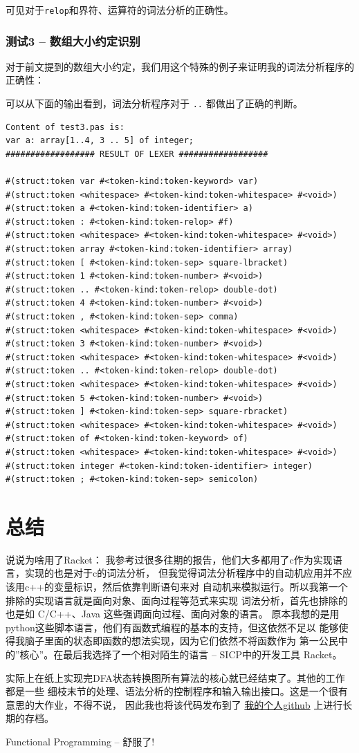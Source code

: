 \documentclass[lang=cn]{elegantpaper}
\begin{document}
可见对于\lstinline|relop|和界符、运算符的词法分析的正确性。

\subsubsection{测试3 -- 数组大小约定识别}

对于前文提到的数组大小约定，我们用这个特殊的例子来证明我的词法分析程序的正确性：



可以从下面的输出看到，词法分析程序对于 \lstinline|..| 都做出了正确的判断。

\begin{lstlisting}
Content of test3.pas is:
var a: array[1..4, 3 .. 5] of integer;
################## RESULT OF LEXER ##################

#(struct:token var #<token-kind:token-keyword> var)
#(struct:token <whitespace> #<token-kind:token-whitespace> #<void>)
#(struct:token a #<token-kind:token-identifier> a)
#(struct:token : #<token-kind:token-relop> #f)
#(struct:token <whitespace> #<token-kind:token-whitespace> #<void>)
#(struct:token array #<token-kind:token-identifier> array)
#(struct:token [ #<token-kind:token-sep> square-lbracket)
#(struct:token 1 #<token-kind:token-number> #<void>)
#(struct:token .. #<token-kind:token-relop> double-dot)
#(struct:token 4 #<token-kind:token-number> #<void>)
#(struct:token , #<token-kind:token-sep> comma)
#(struct:token <whitespace> #<token-kind:token-whitespace> #<void>)
#(struct:token 3 #<token-kind:token-number> #<void>)
#(struct:token <whitespace> #<token-kind:token-whitespace> #<void>)
#(struct:token .. #<token-kind:token-relop> double-dot)
#(struct:token <whitespace> #<token-kind:token-whitespace> #<void>)
#(struct:token 5 #<token-kind:token-number> #<void>)
#(struct:token ] #<token-kind:token-sep> square-rbracket)
#(struct:token <whitespace> #<token-kind:token-whitespace> #<void>)
#(struct:token of #<token-kind:token-keyword> of)
#(struct:token <whitespace> #<token-kind:token-whitespace> #<void>)
#(struct:token integer #<token-kind:token-identifier> integer)
#(struct:token ; #<token-kind:token-sep> semicolon)
\end{lstlisting}

\section{总结}

说说为啥用了Racket：
我参考过很多往期的报告，他们大多都用了c作为实现语言，实现的也是对于c的词法分析，
但我觉得词法分析程序中的自动机应用并不应该用c++的变量标识，然后依靠判断语句来对
自动机来模拟运行。所以我第一个排除的实现语言就是面向对象、面向过程等范式来实现
词法分析，首先也排除的也是如 C/C++、Java 这些强调面向过程、面向对象的语言。
原本我想的是用python这些脚本语言，他们有函数式编程的基本的支持，但这依然不足以
能够使得我脑子里面的{\heiti 状态即函数}的想法实现，因为它们依然不将函数作为
第一公民中的''核心''。在最后我选择了一个相对陌生的语言 -- SICP中的开发工具 Racket。

实际上在纸上实现完DFA状态转换图所有算法的核心就已经结束了。其他的工作都是一些
细枝末节的处理、语法分析的控制程序和输入输出接口。这是一个很有意思的大作业，不得不说，
因此我也将该代码发布到了
\href{https://github.com/Jerryyang2001/racket-pascal-mini-cp}{我的个人github}
上进行长期的存档。

\begin{center}
    Functional Programming -- 舒服了!
\end{center}
\end{document}
